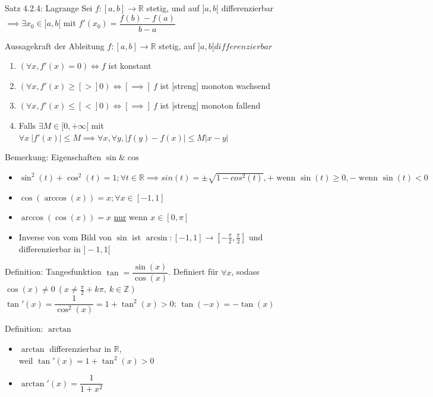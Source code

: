 \documentclass[a4paper,10pt]{article}
\begin{document}
\begin{tbox}
    {Satz 4.2.4: Lagrange}
    Sei $f:[a,b]\longrightarrow \mathbb R$ stetig, und auf $]a,b[$ differenzierbar $\implies \exists x_0\in]a,b[$ mit $f'(x_0)=\dfrac{f(b)-f(a)}{b-a}$    
\end{tbox}
\begin{tbox}
    {Aussagekraft der Ableitung}
    $f:[a,b]\longrightarrow \mathbb R$ stetig, auf $]a,b[ differenzierbar$
    \begin{enumerate}
        \item $(\forall x, f'(x)=0)\iff f$ ist konstant
        \item $(\forall x, f'(x)\ge [>] 0) \iff [\implies]\ f$ ist [streng] monoton wachsend
        \item $(\forall x, f'(x)\le [<] 0)\iff[\implies]\ f$ ist [streng] monoton fallend
        \item Falls $\exists M\in[0,+\infty[$ mit $\forall x \ |f'(x)|\le M\implies \forall x, \forall y, |f(y)-f(x)|\le M|x-y|$
    \end{enumerate}
\end{tbox}
\begin{bembox}
    {Bemerkung: Eigenschaften $\sin \&  \cos$}
    \begin{itemize}
        \item $\sin^2(t)+\cos^2(t)=1;\forall t \in \mathbb R \implies sin(t)=\pm \sqrt{1-cos^2(t)}, + \text{ wenn } \sin(t)\ge 0, - \text{ wenn } \sin(t)<0$
        \item $\cos(\arccos(x))=x; \forall x \in [-1,1]$
        \item $\arccos(\cos(x))=x$ \underline{nur} wenn $x\in[0,\pi]$
        \item Inverse von vom Bild von $\sin$ ist $\arcsin: [-1,1]\longrightarrow[-\frac{\pi}{2},\frac{\pi}{2}]$ und differenzierbar in $]-1,1[$
    \end{itemize}
\end{bembox}
\begin{defbox}
    {Definition: Tangesfunktion}
    $\tan=\dfrac{\sin(x)}{\cos(x)}$. Definiert für $\forall x$, sodass $\cos(x)\neq 0 \ (x\neq \frac{\pi}{2}+k\pi, \ k\in \mathbb Z)$
    \\ $\tan'(x)=\dfrac{1}{\cos^2(x)}=1+\tan^2(x)>0$; $\tan(-x)=-\tan(x)$
    
\end{defbox}
\begin{defbox}
    {Definition: $\arctan$}
    \begin{itemize}
        \item $\arctan$ differenzierbar in $\mathbb R$,
        \\ weil $\tan'(x)=1+\tan^2(x)>0$
        \item $\arctan'(x)=\dfrac{1}{1+x^2}$
    \end{itemize}
\end{defbox}
\end{document}
